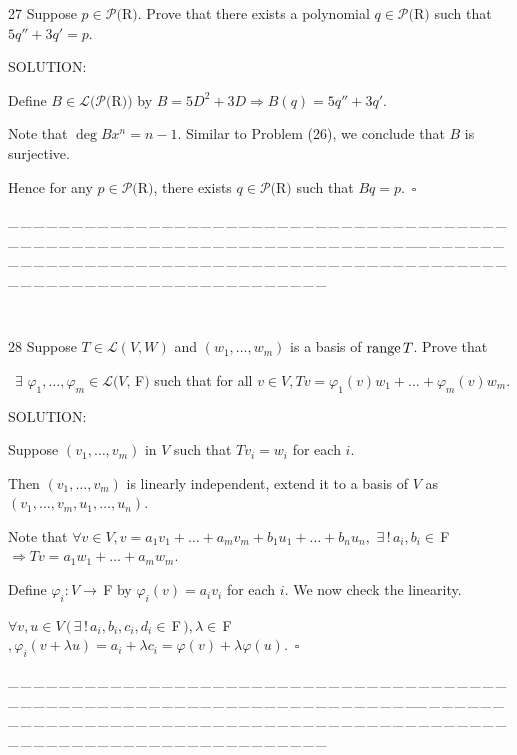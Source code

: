 \documentclass[a4paper, 11pt, UTF8]{article}
\def\range{\textup{range}\,}
\def\Lm{\mathcal{L}}
\def\Po{\mathcal{P}}
\def\Fbfc{$\,{\timesbf F}$}
\begin{document}
\begin{large}
{\timesbf\Large 27} {\timessl\Large 
Suppose $p\in\Po(${\timesbf R}$)$. Prove that there exists a polynomial $q\in\Po(${\timesbf R}$)$ such that $5q'' + 3q' = p$.
}\par
{\timesbf S\footnotesize{OLUTION:}}\par\quad
Define $B\in\Lm(\Po(${\timesbf R}$))$ by $B=5D^2+3D\Rightarrow B(q)=5q''+3q'$.\par\quad
Note that $\deg B x^n=n-1.$ Similar to Problem (26), we conclude that $B$ is surjective.\par\quad
Hence for any $p\in\Po(${\timesbf R}$)$, there exists $q\in\Po(${\timesbf R}$)$ such that $Bq=p.\,\,\,\square$\par
{\tiny \_\,\_\,\_\,\_\,\_\,\_\,\_\,\_\,\_\,\_\,\_\,\_\,\_\,\_\,\_\,\_\,\_\,\_\,\_\,\_\,\_\,\_\,\_\,\_\,\_\,\_\,\_\,\_\,\_\,\_\,\_\,\_\,\_\,\_\,\_\,\_\,\_\,\_\,\_\,\_\,\_\,\_\,\_\,\_\,\_\,\_\,\_\,\_\,\_\,\_\,\_\,\_\,\_\,\_\,\_\,\_\,\_\,\_\,\_\,\_\,\_\,\_\,\_\,\_\,\_\,\_\,\_\,\_\,\_\,\_\,\_\_\,\_\,\_\,\_\,\_\,\_\,\_\,\_\,\_\,\_\,\_\,\_\,\_\,\_\,\_\,\_\,\_\,\_\,\_\,\_\,\_\,\_\,\_\,\_\,\_\,\_\,\_\,\_\,\_\,\_\,\_\,\_\,\_\,\_\,\_\,\_\,\_\,\_\,\_\,\_\,\_\,\_\,\_\,\_\,\_\,\_\,\_\,\_\,\_\,\_\,\_\,\_\,\_\,\_\,\_\,\_\,\_\,\_\,\_\,\_\,\_\,\_\,\_\,\_\,\_\,\_\,\_\,\_\,\_\,\_\,\_}{\tiny\,\par}

{\timesbf\Large 28} {\timessl\Large 
Suppose $T\in\Lm(V,W)$ and $(w_1,\dots,w_m)$ is a basis of $\range T$. Prove that}\par\quad\,
{\timessl\Large $\exists\,\,\varphi_1,\dots,\varphi_m\in\Lm(V,\,${\timesbf F}$)$ such that for all $v\in V,Tv=\varphi_1(v)w_1+\dots+\varphi_m(v)w_m$.
}\par
{\timesbf S\footnotesize{OLUTION:}}\par\quad
Suppose $(v_1,\dots,v_m)$ in $V$ such that $Tv_i=w_i$ for each $i$.\par\qquad
Then $(v_1,\dots,v_m)$ is linearly independent, extend it to a basis of $V$ as $(v_1,\dots,v_m,u_1,\dots,u_n)$.\par\quad
Note that $\forall v\in V,v=a_1 v_1+\dots+a_m v_m+b_1 u_1+\dots+b_n u_n,\,\,\exists\,!\,a_i,b_i\in\Fbfc\Rightarrow Tv=a_1 w_1+\dots+a_m w_m.$\par\quad
Define $\varphi_i:V\rightarrow\,${\timesbf F} by $\varphi_i(v)=a_i v_i$ for each $i$. We now check the linearity.\par\quad
$\forall v,u\in V\,(\,\exists\,!\,a_i,b_i,c_i,d_i\in\Fbfc\,),\lambda\in\Fbfc,\varphi_i(v+\lambda u)=a_i+\lambda c_i=\varphi(v)+\lambda\varphi(u).\,\,\,\square$\par
{\tiny \_\,\_\,\_\,\_\,\_\,\_\,\_\,\_\,\_\,\_\,\_\,\_\,\_\,\_\,\_\,\_\,\_\,\_\,\_\,\_\,\_\,\_\,\_\,\_\,\_\,\_\,\_\,\_\,\_\,\_\,\_\,\_\,\_\,\_\,\_\,\_\,\_\,\_\,\_\,\_\,\_\,\_\,\_\,\_\,\_\,\_\,\_\,\_\,\_\,\_\,\_\,\_\,\_\,\_\,\_\,\_\,\_\,\_\,\_\,\_\,\_\,\_\,\_\,\_\,\_\,\_\,\_\,\_\,\_\,\_\,\_\_\,\_\,\_\,\_\,\_\,\_\,\_\,\_\,\_\,\_\,\_\,\_\,\_\,\_\,\_\,\_\,\_\,\_\,\_\,\_\,\_\,\_\,\_\,\_\,\_\,\_\,\_\,\_\,\_\,\_\,\_\,\_\,\_\,\_\,\_\,\_\,\_\,\_\,\_\,\_\,\_\,\_\,\_\,\_\,\_\,\_\,\_\,\_\,\_\,\_\,\_\,\_\,\_\,\_\,\_\,\_\,\_\,\_\,\_\,\_\,\_\,\_\,\_\,\_\,\_\,\_\,\_\,\_\,\_\,\_\,\_}\par


\end{large}
\end{document}

